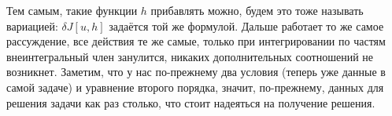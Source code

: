 \documentclass[a4paper]{article}
\begin{document}
    Тем самым, такие функции $h$ прибавлять можно, будем это тоже называть вариацией: $\delta J[u, h]$ задаётся той же формулой.
    Дальше работает то же самое рассуждение, все действия те же самые, только при интегрировании по частям внеинтегральный член занулится, никаких дополнительных соотношений не возникнет.
    Заметим, что у нас по-прежнему два условия (теперь уже данные в самой задаче) и уравнение второго порядка, значит, по-прежнему, данных для решения задачи как раз столько, что стоит надеяться на получение решения.
\end{document}

